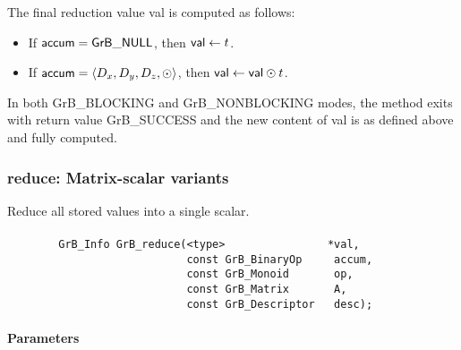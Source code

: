 The final reduction value {\sf val} is computed as follows:
\begin{itemize}
	\item If ${\sf accum} = {\sf GrB\_NULL}$, then ${\sf val} \leftarrow t$.

	\item If ${\sf accum} = \langle D_x, D_y, D_z, \odot \rangle$, then ${\sf val} \leftarrow {\sf val} \odot t$. 
\end{itemize}

In both {\sf GrB\_BLOCKING} and {\sf GrB\_NONBLOCKING}  modes, the method exits with return value 
{\sf GrB\_SUCCESS} and the new content of {\sf val} is as defined above
and fully computed.  

\subsubsection{{\sf reduce}: Matrix-scalar variants}
\label{Sec:Reduce_matrix_scalar}

Reduce all stored values into a single scalar.

\paragraph{\syntax}

\begin{verbatim}
        GrB_Info GrB_reduce(<type>                *val,
                            const GrB_BinaryOp     accum,
                            const GrB_Monoid       op,
                            const GrB_Matrix       A,
                            const GrB_Descriptor   desc);
\end{verbatim}

\paragraph{Parameters}

